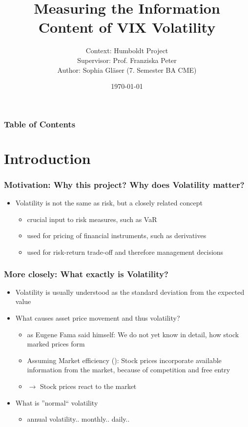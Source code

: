 \documentclass[aspectratio=169]{beamer}
\title{Measuring the Information Content of VIX Volatility}
\author{Context: Humboldt Project\\
Supervisor: Prof. Franziska Peter\\
Author: Sophia Gläser (7. Semester BA CME)}
\date{\small \today}
\begin{document}
\begin{frame}
\maketitle
\end{frame}

\begin{frame}
\frametitle{Table of Contents}
\tableofcontents
\end{frame}

\section{Introduction}

\begin{frame}
\frametitle{Motivation: Why this project? Why does Volatility matter?}
	\begin{itemize}
	\item<1-> Volatility is not the same as risk, but a closely related concept
	\begin{itemize}
	\item<2-> crucial input to risk measures, such as VaR
	\item<2-> used for pricing of financial instruments, such as derivatives
	\item<2-> used for risk-return trade-off and therefore management decisions
	\end{itemize}
	\end{itemize}
\end{frame}

\begin{frame}
\frametitle{More closely: What exactly is Volatility?}
	\begin{itemize}
	\item<1-> Volatility is usually understood as the standard deviation from the expected value 
	\item<1-> What causes asset price movement and thus volatility?
	\begin{itemize}
	\item<2-> as Eugene Fama said himself: We do not yet know in detail, how stock marked prices form 
	\item<2-> Assuming Market efficiency (\citeauthor{fama1970}): Stock prices incorporate available information from the market, because of competition and free entry 
	\item<2-> $\rightarrow$ Stock prices react to the market 
	\end{itemize}
	\end{itemize}
	
	\begin{itemize}
	\item<3-> What is ''normal`` volatility
	\begin{itemize}
	\item<4-> annual volatility.. monthly.. daily..
	\end{itemize}
	\end{itemize}
\end{frame}
\end{document}
